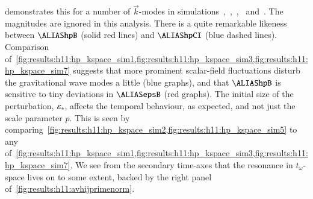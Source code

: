      demonstrates this for a number of $\vec{k}$-modes in simulations~,~,~,~ and~. The magnitudes are ignored in this analysis. There is a quite remarkable likeness between $\hpB$ (solid red lines) and $\hpCI$ (blue dashed lines). Comparison of~\cref{fig:results:h11:hp_kspace_sim1,fig:results:h11:hp_kspace_sim3,fig:results:h11:hp_kspace_sim7} suggests that more prominent scalar-field fluctuations disturb the gravitational wave modes a little (blue graphs), and that $\hpB$ is sensitive to tiny deviations in $\epsB$ (red graphs). %
    The initial size of the perturbation, $\varepsilon_\ast$, affects the temporal behaviour, as expected, and not just the scale parameter $p$. This is seen by comparing~\cref{fig:results:h11:hp_kspace_sim2,fig:results:h11:hp_kspace_sim5} to any of~\cref{fig:results:h11:hp_kspace_sim1,fig:results:h11:hp_kspace_sim3,fig:results:h11:hp_kspace_sim7}. We see from the secondary time-axes that the resonance in $t_\omega$-space lives on to some extent, backed by the right panel of~\cref{fig:results:h11:avhijprimenorm}. %


